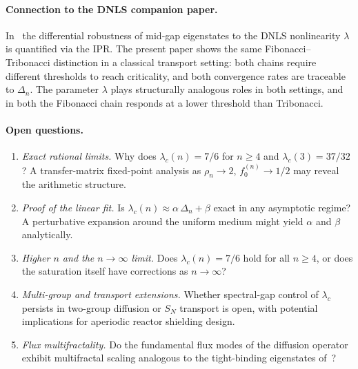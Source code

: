 \documentclass[11pt]{article}
\newcommand{\lc}{\lambda_c}
\newcommand{\rhon}{\rho_n}
\begin{document}
\paragraph{Connection to the DNLS companion paper.}
In~\cite{Grossi2026DNLS} the differential robustness of mid-gap eigenstates
to the DNLS nonlinearity $\lambda$ is quantified via the IPR.
The present paper shows the same Fibonacci--Tribonacci distinction in a
classical transport setting: both chains require different thresholds to
reach criticality, and both convergence rates are traceable to $\Delta_n$.
The parameter $\lambda$ plays structurally analogous roles in both settings,
and in both the Fibonacci chain responds at a lower threshold than Tribonacci.

\paragraph{Open questions.}
\begin{enumerate}
  \item \emph{Exact rational limits.}
    Why does $\lc(n) = 7/6$ for $n \geq 4$ and $\lc(3) = 37/32$?
    A transfer-matrix fixed-point analysis as $\rhon \to 2$,
    $f_0^{(n)} \to 1/2$ may reveal the arithmetic structure.
  \item \emph{Proof of the linear fit.}
    Is $\lc(n) \approx \alpha\,\Delta_n + \beta$ exact in any asymptotic
    regime? A perturbative expansion around the uniform medium might
    yield $\alpha$ and $\beta$ analytically.
  \item \emph{Higher $n$ and the $n \to \infty$ limit.}
    Does $\lc(n) = 7/6$ hold for all $n \geq 4$, or does the saturation
    itself have corrections as $n \to \infty$?
  \item \emph{Multi-group and transport extensions.}
    Whether spectral-gap control of $\lc$ persists in two-group diffusion
    or $S_N$ transport is open, with potential implications for aperiodic
    reactor shielding design.
  \item \emph{Flux multifractality.}
    Do the fundamental flux modes of the diffusion operator exhibit
    multifractal scaling analogous to the tight-binding eigenstates
    of~\cite{Krebbekx2023,Mace2016}?
\end{enumerate}
\end{document}
